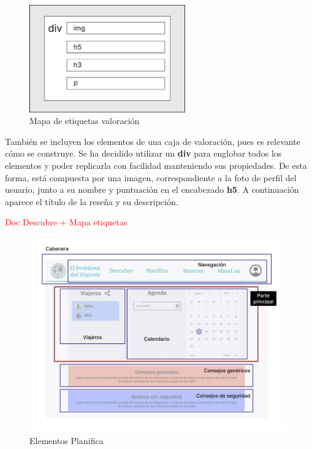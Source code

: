\documentclass[11pt, a4paper]{book}
\begin{document}
	\begin{figure} [H]
		\centering
		\includegraphics[width=0.6\textwidth]{HTML/Etiq-valoracion.jpg}
		\caption{Mapa de etiquetas valoración}
	\end{figure}

	También se incluyen los elementos de una caja de valoración, pues es relevante cómo se construye. Se ha decidido utilizar un \textbf{div} para englobar todos los elementos y poder replicarla con facilidad manteniendo sus propiedades. De esta forma, está compuesta por una imagen, correspondiente a la foto de perfil del usuario, junto a su nombre y puntuación en el encabezado \textbf{h5}. A continuación aparece el título de la reseña y su descripción.

	\begin{Huge}
		\textcolor{red}{Doc Descubre + Mapa etiquetas}
	\end{Huge}

	\begin{figure} [H]
		\centering
		\includegraphics[width=\textwidth]{HTML/Doc-planifica.jpg}
		\caption{Elementos Planifica}
	\end{figure}
\end{document}
